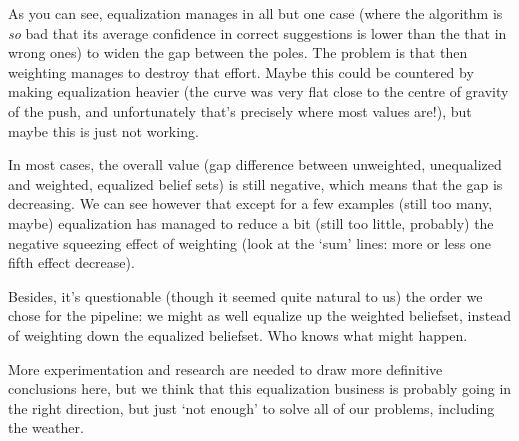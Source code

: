 \documentclass[11pt]{article}
\begin{document}
As you can see, equalization manages in all but one case (where the algorithm is \emph{so} bad that its average confidence in correct suggestions is lower than the that in wrong ones) to widen the gap between the poles. The problem is that then weighting manages to destroy that effort. Maybe this could be countered by making equalization heavier (the curve was very flat close to the centre of gravity of the push, and unfortunately that's precisely where most values are!), but maybe this is just not working.

In most cases, the overall value (gap difference between unweighted, unequalized and weighted, equalized belief sets) is still negative, which means that the gap is decreasing. We can see however that except for a few examples (still too many, maybe) equalization has managed to reduce a bit (still too little, probably) the negative squeezing effect of weighting (look at the `sum' lines: more or less one fifth effect decrease).

Besides, it's questionable (though it seemed quite natural to us) the order we chose for the pipeline: we might as well equalize up the weighted beliefset, instead of weighting down the equalized beliefset. Who knows what might happen.

More experimentation and research are needed to draw more definitive conclusions here, but we think that this equalization business is probably going in the right direction, but just `not enough' to solve all of our problems, including the weather.
\end{document}
